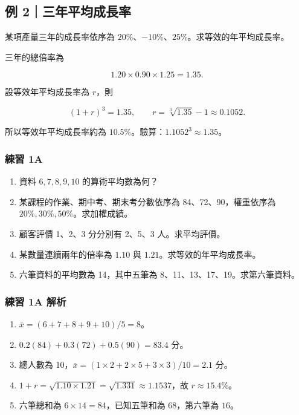 \documentclass[11pt,a4paper]{article}
\providecommand{\tightlist}{%
  \setlength{\itemsep}{0pt}\setlength{\parskip}{0pt}}
\begin{document}
\subsection{例 2｜三年平均成長率}\label{ux4f8b-2ux4e09ux5e74ux5e73ux5747ux6210ux9577ux7387}

某項產量三年的成長率依序為 \(20\%\)、\(-10\%\)、\(25\%\)。求等效的年平均成長率。

三年的總倍率為

\[
1.20\times0.90\times1.25=1.35.
\]

設等效年平均成長率為 \(r\)，則

\[
(1+r)^3=1.35,\qquad
r=\sqrt[3]{1.35}-1\approx0.1052.
\]

所以等效年平均成長率約為 \(\boxed{10.5\%}\)。驗算：\(1.1052^3\approx1.35\)。

\subsubsection{練習 1A}\label{ux7df4ux7fd2-1a}

\begin{enumerate}
\def\labelenumi{\arabic{enumi}.}
\tightlist
\item
  資料 \(6,7,8,9,10\) 的算術平均數為何？
\item
  某課程的作業、期中考、期末考分數依序為 84、72、90，權重依序為 \(20\%,30\%,50\%\)。求加權成績。
\item
  顧客評價 1、2、3 分分別有 2、5、3 人。求平均評價。
\item
  某數量連續兩年的倍率為 \(1.10\) 與 \(1.21\)。求等效的年平均成長率。
\item
  六筆資料的平均數為 14，其中五筆為 8、11、13、17、19。求第六筆資料。
\end{enumerate}

\subsubsection{練習 1A 解析}\label{ux7df4ux7fd2-1a-ux89e3ux6790}

\begin{enumerate}
\def\labelenumi{\arabic{enumi}.}
\tightlist
\item
  \(\bar{x}=(6+7+8+9+10)/5=\boxed{8}\)。
\item
  \(0.2(84)+0.3(72)+0.5(90)=\boxed{83.4}\) 分。
\item
  總人數為 10，\(\bar{x}=(1\times2+2\times5+3\times3)/10=\boxed{2.1}\) 分。
\item
  \(1+r=\sqrt{1.10\times1.21}=\sqrt{1.331}\approx1.1537\)，故 \(r\approx\boxed{15.4\%}\)。
\item
  六筆總和為 \(6\times14=84\)，已知五筆和為 68，第六筆為 \(\boxed{16}\)。
\end{enumerate}
\end{document}
